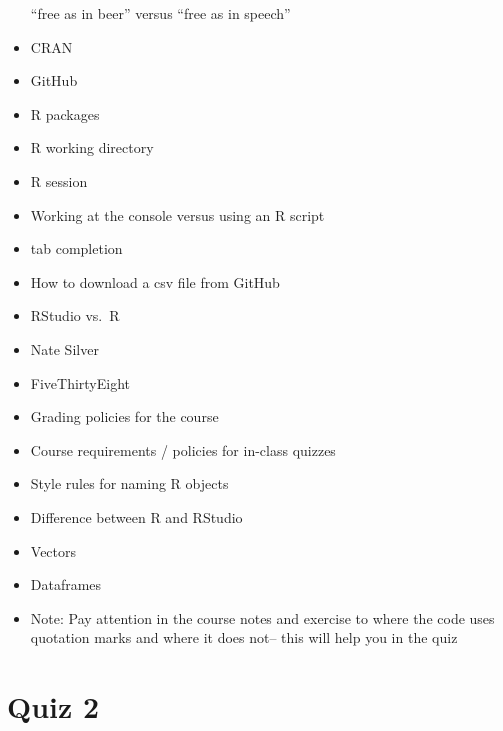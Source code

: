 \documentclass[]{book}
\theoremstyle{definition}
\theoremstyle{definition}
\theoremstyle{definition}
\theoremstyle{remark}
\begin{document}
\begin{itemize}
  ``free as in beer'' versus ``free as in speech''
\item
  CRAN
\item
  GitHub
\item
  R packages
\item
  R working directory
\item
  R session
\item
  Working at the console versus using an R script
\item
  tab completion
\item
  How to download a csv file from GitHub
\item
  RStudio vs.~R
\item
  Nate Silver
\item
  FiveThirtyEight
\item
  Grading policies for the course
\item
  Course requirements / policies for in-class quizzes
\item
  Style rules for naming R objects
\item
  Difference between R and RStudio
\item
  Vectors
\item
  Dataframes
\item
  Note: Pay attention in the course notes and exercise to where the code
  uses quotation marks and where it does not-- this will help you in the
  quiz
\end{itemize}

\section{Quiz 2}\label{quiz-2}
\end{document}
